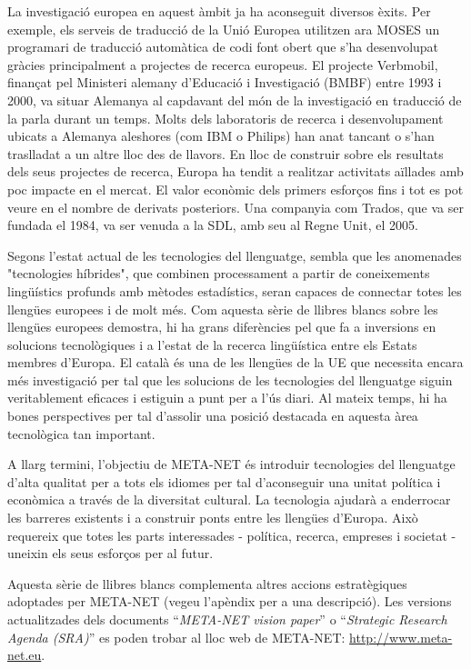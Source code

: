 \begin{multicols}{2}
La investigació europea en aquest àmbit ja ha aconseguit diversos èxits. Per exemple, els serveis de traducció de la Unió Europea utilitzen ara  MOSES un programari de traducció automàtica de codi font obert que s'ha desenvolupat gràcies principalment a projectes de recerca europeus. El projecte Verbmobil, finançat pel Ministeri alemany d'Educació i Investigació (BMBF) entre 1993 i 2000, va situar Alemanya al capdavant del món de la investigació en traducció de la parla durant un temps. Molts dels laboratoris de recerca i desenvolupament ubicats a Alemanya aleshores (com IBM o Philips) han anat tancant o s'han traslladat a un altre lloc des de llavors. En lloc de construir sobre els resultats dels seus projectes de recerca, Europa ha tendit a realitzar activitats aïllades amb poc impacte en el mercat. El valor econòmic dels primers esforços fins i tot es pot veure en el nombre de derivats posteriors. Una companyia com Trados, que va ser fundada el 1984, va ser venuda a la SDL, amb seu al Regne Unit, el 2005.


Segons l'estat actual de les tecnologies del llenguatge, sembla que les anomenades "tecnologies híbrides", que combinen processament a partir de coneixements lingüístics profunds amb mètodes estadístics, seran capaces de connectar totes les llengües europees i de molt més. Com aquesta sèrie de llibres blancs sobre les llengües europees demostra, hi ha grans diferències  pel que fa a inversions en solucions tecnològiques i a l'estat de la recerca lingüística entre els Estats membres d'Europa. El català és una de les llengües de la UE que necessita encara més investigació per tal que les solucions de les tecnologies del llenguatge siguin veritablement eficaces i estiguin a punt per a l’ús diari. Al mateix temps, hi ha bones perspectives per tal d'assolir una posició destacada en aquesta àrea tecnològica tan important.

 A llarg termini, l’objectiu de META-NET és introduir tecnologies del llenguatge d'alta qualitat  per a tots els idiomes per tal d'aconseguir una unitat política i econòmica a través de la diversitat cultural. La tecnologia ajudarà a enderrocar les barreres existents i a construir ponts entre les llengües d'Europa. Això requereix que totes les parts interessades - política, recerca, empreses i societat - uneixin els seus esforços per al futur.

Aquesta sèrie de llibres blancs complementa altres accions estratègiques adoptades per META-NET (vegeu l'apèndix per a una descripció). Les versions actualitzades dels documents “\textit{META-NET vision paper}” \cite{Meta1} o “\textit{Strategic Research Agenda (SRA)}” es poden trobar al lloc web de META-NET: \url{http://www.meta-net.eu}.
\end{multicols}

